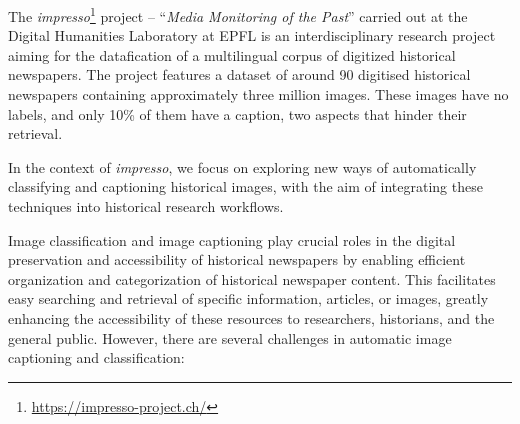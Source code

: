 
The \textit{impresso}\footnote{\url{https://impresso-project.ch/}} project -- ``\textit{Media Monitoring of the Past}'' carried out at the Digital Humanities Laboratory at EPFL is an interdisciplinary research project aiming for the datafication of a multilingual corpus of digitized historical newspapers. The project features a dataset of around 90 digitised historical newspapers containing approximately three million images. These images have no labels, and only 10\% of them have a caption, two aspects that hinder their retrieval. 

In the context of \textit{impresso}, we focus on exploring new ways of automatically classifying and captioning historical images, with the aim of integrating these techniques into historical research workflows.



Image classification and image captioning play crucial roles in the digital preservation and accessibility of historical newspapers by enabling efficient organization and categorization of historical newspaper content. This facilitates easy searching and retrieval of specific information, articles, or images, greatly enhancing the accessibility of these resources to researchers, historians, and the general public. However, there are several challenges in automatic image captioning and classification:

